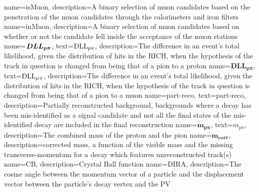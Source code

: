                  {
                   name=isMuon,
                                    description={A binary selection of muon candidates based on the penetration of the muon candidates through the calorimeters and iron filters}
                                        }
                 {
                   name=inMuon,
                                    description={A binary selection of muon candidates based on whether or not the candidate fell inside the acceptance of the muon stations}
}                                        
                 {
                   name=$\mathbold{DLL_{\proton\pi}}$,
                  text=$\mathrm{DLL}_{{p}{\pi}}$,
                 description={The difference in an event’s total likelihood, given the distribution of hits in the RICH, when the hypothesis of the track in question is changed from being that of a pion to a proton}                
                                       }
                 {
                   name=$\mathbold{DLL_{\mu\pi}}$,
                  text=$\mathrm{DLL}_{{\mu}\pi}$,
                 description={The difference in an event’s total likelihood, given the distribution of hits in the RICH, when the hypothesis of the track in question is changed from being that of a pion to a muon 
}}
                 {
                   name=part-reco,
                  text=part-reco,
                 description={Partially reconstructed background, backgrounds where a decay has been mis-identified as a signal candidate and not all the final states of the mis-identified decay are included in the final reconstruction  
}}
                 {
                    name=$\mathbold{m_{p\pi}}$,
                     text=$m_{p\pi}$,
                   description={The combined mass of the proton and the pion}
                 }
                 {
                   name=$\mathbold{m_{corr}}$,
                   description={corrected mass, a function of the visible mass and the missing transverse-momentum for a decay which features unreconstructed track(s)}
                 }                 
                 {
                   name=CB,
                   description={Crystal Ball function}
                 }                 
                 {
                   name=DIRA,
                   description={The cosine angle between the momentum vector of a particle and the displacement vector between the particle's decay vertex and the \Gls{PV}}
                 }
